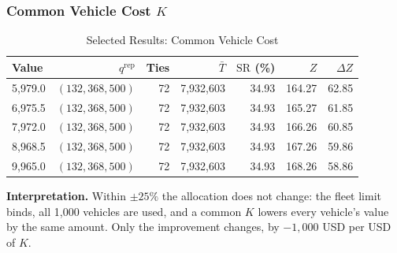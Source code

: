 \documentclass[10pt,a4paper]{article}
\begin{document}
\subsubsection{Common Vehicle Cost $K$}
\begin{table}[H]
\centering\small
\caption{Selected Results: Common Vehicle Cost}\label{tab:an-selected-K}
\begin{tabular}{lrrrrrr}
\toprule
Value & $q^{\mathrm{rep}}$ & Ties & $\bar T$ & $\mathrm{SR}$ (\%) & $Z$ & $\Delta Z$\\\midrule
5,979.0 & $(132,368,500)$ & 72 & 7,932,603 & 34.93 & 164.27 & 62.85\\
6,975.5 & $(132,368,500)$ & 72 & 7,932,603 & 34.93 & 165.27 & 61.85\\
7,972.0 & $(132,368,500)$ & 72 & 7,932,603 & 34.93 & 166.26 & 60.85\\
8,968.5 & $(132,368,500)$ & 72 & 7,932,603 & 34.93 & 167.26 & 59.86\\
9,965.0 & $(132,368,500)$ & 72 & 7,932,603 & 34.93 & 168.26 & 58.86\\
\bottomrule
\end{tabular}
\end{table}
\textbf{Interpretation.} Within $\pm25\%$ the allocation does not change: the fleet limit binds, all 1{,}000 vehicles are used, and a common $K$ lowers every vehicle's value by the same amount. Only the improvement changes, by $-1{,}000$ USD per USD of $K$.
\end{document}
